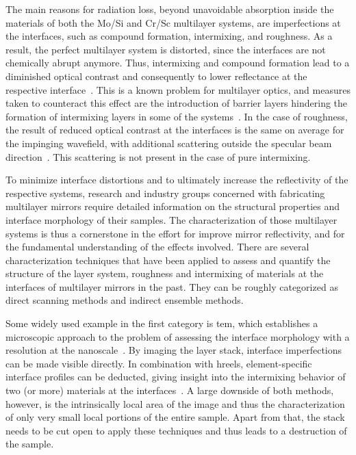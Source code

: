 The main reasons for radiation loss, beyond unavoidable absorption inside the
materials of both the Mo/Si and Cr/Sc multilayer systems, are imperfections at
the interfaces, such as compound formation, intermixing, and roughness.
As a result, the perfect multilayer system is distorted, since the interfaces
are not chemically abrupt anymore.
Thus, intermixing and compound formation lead to a diminished optical contrast
and consequently to lower reflectance at the respective
interface~\cite{nakajima_interdiffusion_1988}.
This is a known problem for multilayer optics, and measures taken to counteract
this effect are the introduction of barrier layers hindering the formation of
intermixing layers in some of the
systems~\cite{braun_grenzflachen-optimierte_2003,braun_mo/si_2002}.
In the case of roughness, the result of reduced optical contrast at the
interfaces is the same on average for the impinging wavefield, with additional
scattering outside the specular beam direction~\cite{sinha_x-ray_1994}.
This scattering is not present in the case of pure intermixing.

To minimize interface distortions and to ultimately increase the reflectivity of
the respective systems, research and industry groups concerned with fabricating
multilayer mirrors require detailed information on the structural properties and
interface morphology of their samples.
The characterization of those multilayer systems is thus a cornerstone in the
effort for improve mirror reflectivity, and for the fundamental understanding of
the effects involved.
There are several characterization techniques that have been applied to assess
and quantify the structure of the layer system, roughness and intermixing of
materials at the interfaces of multilayer mirrors in the past.
They can be roughly categorized as direct scanning methods and indirect ensemble
methods.

Some widely used example in the first category is \gls{tem}, which establishes a
microscopic approach to the problem of assessing the interface morphology with a
resolution at the nanoscale~\cite{stearns_thermally_1990,
bajt_investigation_2001}.
By imaging the layer stack, interface imperfections can be made visible
directly.
In combination with \gls{hreels}, element-specific interface profiles can be
deducted, giving insight into the intermixing behavior of two (or more)
materials at the interfaces~\cite{egerton_electron_2011,
prasciolu_thermal_2014}.
A large downside of both methods, however, is the intrinsically local area of
the image and thus the characterization of only very small local portions of the
entire sample.
Apart from that, the stack needs to be cut open to apply these techniques and
thus leads to a destruction of the sample.

